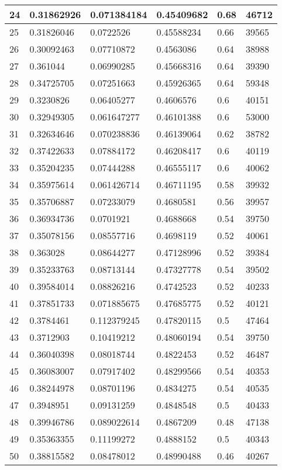 \begin{longtable}{|l|l|l|l|l|l|}
24 & 0.31862926 & 0.071384184 & 0.45409682 & 0.68 & 46712 \\ \hline 
25 & 0.31826046 & 0.0722526 & 0.45588234 & 0.66 & 39565 \\ \hline 
26 & 0.30092463 & 0.07710872 & 0.4563086 & 0.64 & 38988 \\ \hline 
27 & 0.361044 & 0.06990285 & 0.45668316 & 0.64 & 39390 \\ \hline 
28 & 0.34725705 & 0.07251663 & 0.45926365 & 0.64 & 59348 \\ \hline 
29 & 0.3230826 & 0.06405277 & 0.4606576 & 0.6 & 40151 \\ \hline 
30 & 0.32949305 & 0.061647277 & 0.46101388 & 0.6 & 53000 \\ \hline 
31 & 0.32634646 & 0.070238836 & 0.46139064 & 0.62 & 38782 \\ \hline 
32 & 0.37422633 & 0.07884172 & 0.46208417 & 0.6 & 40119 \\ \hline 
33 & 0.35204235 & 0.07444288 & 0.46555117 & 0.6 & 40062 \\ \hline 
34 & 0.35975614 & 0.061426714 & 0.46711195 & 0.58 & 39932 \\ \hline 
35 & 0.35706887 & 0.07233079 & 0.4680581 & 0.56 & 39957 \\ \hline 
36 & 0.36934736 & 0.0701921 & 0.4688668 & 0.54 & 39750 \\ \hline 
37 & 0.35078156 & 0.08557716 & 0.4698119 & 0.52 & 40061 \\ \hline 
38 & 0.363028 & 0.08644277 & 0.47128996 & 0.52 & 39384 \\ \hline 
39 & 0.35233763 & 0.08713144 & 0.47327778 & 0.54 & 39502 \\ \hline 
40 & 0.39584014 & 0.08826216 & 0.4742523 & 0.52 & 40233 \\ \hline 
41 & 0.37851733 & 0.071885675 & 0.47685775 & 0.52 & 40121 \\ \hline 
42 & 0.3784461 & 0.112379245 & 0.47820115 & 0.5 & 47464 \\ \hline 
43 & 0.3712903 & 0.10419212 & 0.48060194 & 0.54 & 39750 \\ \hline 
44 & 0.36040398 & 0.08018744 & 0.4822453 & 0.52 & 46487 \\ \hline 
45 & 0.36083007 & 0.07917402 & 0.48299566 & 0.54 & 40353 \\ \hline 
46 & 0.38244978 & 0.08701196 & 0.4834275 & 0.54 & 40535 \\ \hline 
47 & 0.3948951 & 0.09131259 & 0.4848548 & 0.5 & 40433 \\ \hline 
48 & 0.39946786 & 0.089022614 & 0.4867209 & 0.48 & 47138 \\ \hline 
49 & 0.35363355 & 0.11199272 & 0.4888152 & 0.5 & 40343 \\ \hline 
50 & 0.38815582 & 0.08478012 & 0.48990488 & 0.46 & 40267 \\ \hline 
\end{longtable}